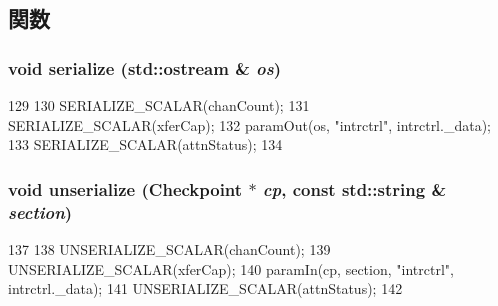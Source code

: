 \subsection{関数}
\hypertarget{structCopyEngineReg_1_1Regs_a53e036786d17361be4c7320d39c99b84}{
\subsubsection[{serialize}]{\setlength{\rightskip}{0pt plus 5cm}void serialize (std::ostream \& {\em os})}}
\label{structCopyEngineReg_1_1Regs_a53e036786d17361be4c7320d39c99b84}



\begin{DoxyCode}
129     {
130         SERIALIZE_SCALAR(chanCount);
131         SERIALIZE_SCALAR(xferCap);
132         paramOut(os, "intrctrl", intrctrl._data);
133         SERIALIZE_SCALAR(attnStatus);
134     }
\end{DoxyCode}
\hypertarget{structCopyEngineReg_1_1Regs_af22e5d6d660b97db37003ac61ac4ee49}{
\subsubsection[{unserialize}]{\setlength{\rightskip}{0pt plus 5cm}void unserialize ({\bf Checkpoint} $\ast$ {\em cp}, \/  const std::string \& {\em section})}}
\label{structCopyEngineReg_1_1Regs_af22e5d6d660b97db37003ac61ac4ee49}



\begin{DoxyCode}
137     {
138         UNSERIALIZE_SCALAR(chanCount);
139         UNSERIALIZE_SCALAR(xferCap);
140         paramIn(cp, section, "intrctrl", intrctrl._data);
141         UNSERIALIZE_SCALAR(attnStatus);
142     }
\end{DoxyCode}


